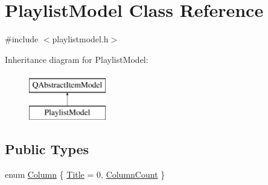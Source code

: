 \hypertarget{class_playlist_model}{\section{Playlist\-Model Class Reference}
\label{class_playlist_model}
}


{\ttfamily \#include $<$playlistmodel.\-h$>$}

Inheritance diagram for Playlist\-Model\-:\begin{figure}[H]
\begin{center}
\leavevmode
\includegraphics[height=2.000000cm]{class_playlist_model}
\end{center}
\end{figure}
\subsection*{Public Types}
\begin{DoxyCompactItemize}
\item 
enum \hyperlink{class_playlist_model_a85df23455e37bba0806ef488fb96f435}{Column} \{ \hyperlink{class_playlist_model_a85df23455e37bba0806ef488fb96f435ad177ef9079b494b37664af91083db9f2}{Title} = 0, 
\hyperlink{class_playlist_model_a85df23455e37bba0806ef488fb96f435a5e948ab2605fd6c754aff3bef76f0373}{Column\-Count}
 \}
\end{DoxyCompactItemize}
